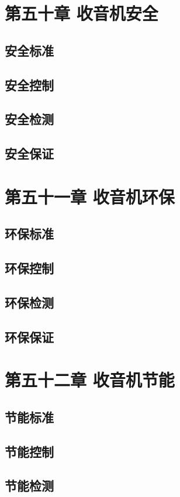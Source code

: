\documentclass[12pt,UTF8]{ctexbook}
\begin{document}
\chapter{第五十章 收音机安全}

\section{安全标准}
\section{安全控制}
\section{安全检测}
\section{安全保证}

\chapter{第五十一章 收音机环保}

\section{环保标准}
\section{环保控制}
\section{环保检测}
\section{环保保证}

\chapter{第五十二章 收音机节能}

\section{节能标准}
\section{节能控制}
\section{节能检测}
\end{document}
